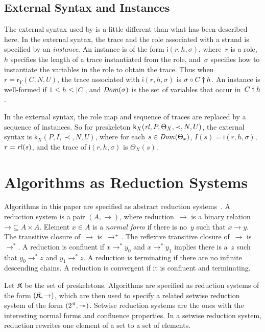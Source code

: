 \documentclass[12pt]{report}
\theoremstyle{definition}
\newcommand{\sdom}{\fn{Dom}}
\newcommand{\role}{\mathsf{r}}
\newcommand{\skel}{\mathsf{k}}
\newcommand{\rl}{\fn{rl}}
\newcommand{\inst}{\mathsf{i}}
\begin{document}
\section{External Syntax and Instances}\label{sec:instances}

The external syntax used by {\cpsa} is a little different than what
has been described here.  In the external syntax, the trace and the
role associated with a strand is specified by an
\emph{instance}.  An instance is of the form
$\inst(r,h,\sigma)$, where~$r$ is a role, $h$ specifies the length of
a trace instantiated from the role, and~$\sigma$ specifies how to
instantiate the variables in the role to obtain the trace.  Thus when
$r=\role_Y(C,N,U)$, the trace associated with $\inst(r,h,\sigma)$ is
$\sigma\circ C\dagger h$.  An instance is well-formed if $1\leq
h\leq|C|$, and $\sdom(\sigma)$ is the set of variables that occur
in~$C\dagger h$.

In the external syntax, the role map and sequence of traces are
replaced by a sequence of instances.  So for preskeleton
$\skel_X(\rl,P,\Theta_X,\prec,N,U)$, the external syntax is
$\skel_X(P,I,\prec,N,U)$, where for each $s\in\sdom(\Theta_x)$,
$I(s)=\inst(r,h,\sigma)$, $r=\rl(s)$, and the trace of
$\inst(r,h,\sigma)$ is $\Theta_X(s)$.

\chapter{Algorithms as Reduction Systems}\label{chp:algorithms}

Algorithms in this paper are specified as abstract reduction
systems~\cite[Chapter~2]{BaaderNipkow98}.  A reduction system is a
pair $(A,\to)$, where reduction~$\to$ is a binary relation
$\mathord{\to}\subseteq A\times A$.  Element $x\in A$ is a
\emph{normal form} if there is no~$y$ such that
$x\to y$.  The transitive closure of~$\to$ is~$\to^+$.  The reflexive
transitive closure of~$\to$ is~$\to^\ast$.  A reduction is confluent
if $x\to^\ast y_0$ and $x\to^\ast y_1$ implies there is a~$z$ such
that $y_0\to^\ast z$ and $y_1\to^\ast z$.  A reduction is terminating
if there are no infinite descending chains.  A reduction is convergent
if it is confluent and terminating.

Let $\mathfrak K$ be the set of preskeletons.  Algorithms are specified as
reduction systems of the form $(\mathfrak K,\to)$, which are then used to
specify a related setwise reduction system of the form
$(2^{\mathfrak K},\mathord\twoheadrightarrow)$.  Setwise reduction
systems are the ones with the interesting normal forms and confluence
properties.  In a setwise reduction system, reduction rewrites one
element of a set to a set of elements.
\end{document}
